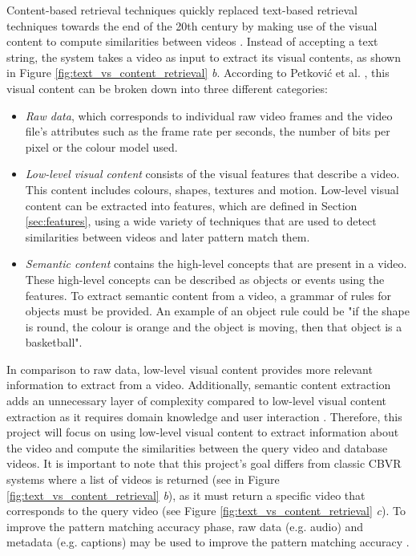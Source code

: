 \documentclass[11pt,openany,a4paper]{article}
\begin{document}
Content-based retrieval techniques quickly replaced text-based retrieval techniques towards the end of the 20th century by making use of the visual content to compute similarities between videos \cite{lai2015trajectory}. Instead of accepting a text string, the system takes a video as input to extract its visual contents, as shown in Figure \ref{fig:text_vs_content_retrieval} \emph{b}. According to Petković et al. \cite{petkovic2000}, this visual content can be broken down into three different categories:
\begin{itemize}
    \item \textit{Raw data}, which corresponds to individual raw video frames and the video file's attributes such as the frame rate per seconds, the number of bits per pixel or the colour model used.
    \item \textit{Low-level visual content}  consists of the visual features that describe a video. This content includes colours, shapes, textures and motion. Low-level visual content can be extracted into features, which are defined in Section \ref{sec:features}, using a wide variety of techniques that are used to detect similarities between videos \cite{lai2015trajectory} and later pattern match them.
    \item \textit{Semantic content} contains the high-level concepts that are present in a video. These high-level concepts can be described as objects or events using the features. To extract semantic content from a video, a grammar of rules for objects must be provided. An example of an object rule could be "if the shape is round, the colour is orange and the object is moving, then that object is a basketball".
\end{itemize}

In comparison to raw data, low-level visual content provides more relevant information to extract from a video. Additionally, semantic content extraction adds an unnecessary layer of complexity compared to low-level visual content extraction as it requires domain knowledge and user interaction \cite{petkovic2000}. Therefore, this project will focus on using low-level visual content to extract information about the video and compute the similarities between the query video and database videos. It is important to note that this project's goal differs from classic CBVR systems where a list of videos is returned (see in Figure \ref{fig:text_vs_content_retrieval} \emph{b}), as it must return a specific video that corresponds to the query video (see Figure \ref{fig:text_vs_content_retrieval} \emph{c}). To improve the pattern matching accuracy phase, raw data (e.g. audio) and metadata (e.g. captions) may be used to improve the pattern matching accuracy \cite{patel2012}.\\
\end{document}
